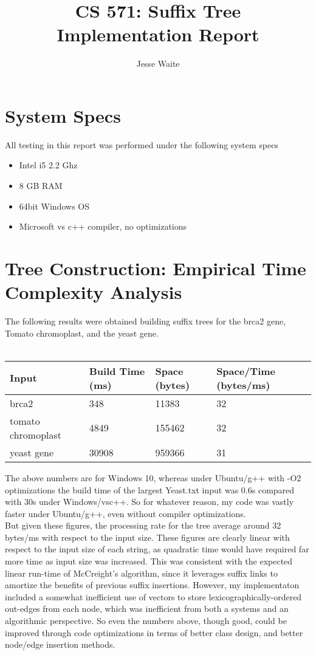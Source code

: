 \documentclass[12pt]{article}
\begin{document}
	\title{CS 571: Suffix Tree Implementation Report}
	\author{Jesse Waite}
	\renewcommand{\today}{Spring 2016}
	\maketitle

\section{System Specs}
All testing in this report was performed under the following system specs
\begin{itemize}
\item Intel i5 2.2 Ghz
\item 8 GB RAM
\item 64bit Windows OS
\item Microsoft vs c++ compiler, no optimizations
\end{itemize}

\section{Tree Construction: Empirical Time Complexity Analysis}
The following results were obtained building suffix trees for the brca2 gene, Tomato chromoplast, and the yeast gene. \\ \\
\begin{tabular}{l l l l}
Input & Build Time (ms) & Space (bytes) & Space/Time (bytes/ms)\\
\hline
brca2 & 348 & 11383 & 32 \\
tomato chromoplast & 4849 & 155462 & 32 \\
yeast gene & 30908 & 959366 & 31 \\
\end{tabular}
\bigskip

The above numbers are for Windows 10, whereas under Ubuntu/g++ with -O2 optimizations the build time of the largest Yeast.txt input was 0.6s compared with 30s under Windows/vsc++.
So for whatever reason, my code was vastly faster under Ubuntu/g++, even without compiler optimizations. \\

But given these figures, the processing rate for the tree average around 32 bytes/ms with respect to the input size. These figures are clearly linear with respect to the input
size of each string, as quadratic time would have required far more time as input size was increased. This was consistent with the expected linear run-time of McCreight's algorithm,
since it leverages suffix links to amortize the benefits of previous suffix insertions. However, my implementaton included a somewhat inefficient use of vectors
to store lexicographically-ordered out-edges from each node, which was inefficient from both a systems and an algorithmic perspective. So even the numbers above, though good, could be improved
through code optimizations in terms of better class design, and better node/edge insertion methods. \\
\end{document}
